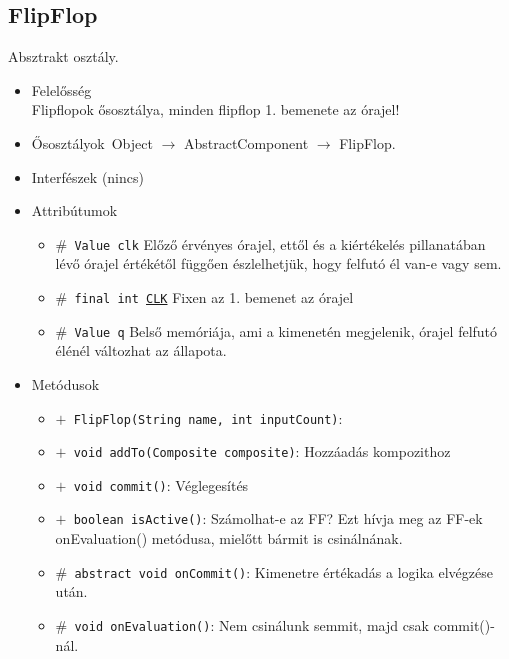 \subsection{FlipFlop}
Absztrakt osztály.
\begin{itemize}
\item Felelősség\\
Flipflopok ősosztálya, minden flipflop 1. bemenete az órajel!
\item Ősosztályok\ Object $\rightarrow{}$ AbstractComponent $\rightarrow{}$ FlipFlop.
\item Interfészek (nincs)
\item Attribútumok $\ $
\begin{itemize}
	\item[] \texttt{$\#$ Value clk} Előző érvényes órajel, ettől és a kiértékelés pillanatában lévő órajel értékétől  függően észlelhetjük, hogy felfutó él van-e vagy sem.
	\item[] \texttt{$\#$ final int \underline{CLK}} Fixen az 1. bemenet az órajel
	\item[] \texttt{$\#$ Value q} Belső memóriája, ami a kimenetén megjelenik, órajel felfutó élénél változhat az állapota.
\end{itemize}
\item Metódusok$\ $
\begin{itemize}
	\item[] \texttt{$+$ FlipFlop(String name, int inputCount)}: 
	\item[] \texttt{$+$ void addTo(Composite composite)}: Hozzáadás kompozithoz
	\item[] \texttt{$+$ void commit()}: Véglegesítés
	\item[] \texttt{$+$ boolean isActive()}: Számolhat-e az FF? Ezt hívja meg az FF-ek onEvaluation() metódusa, mielőtt  bármit is csinálnának.
	\item[] \texttt{$\#$ abstract void onCommit()}: Kimenetre értékadás a logika elvégzése után.
	\item[] \texttt{$\#$ void onEvaluation()}: Nem csinálunk semmit, majd csak commit()-nál.
\end{itemize}
\end{itemize}

